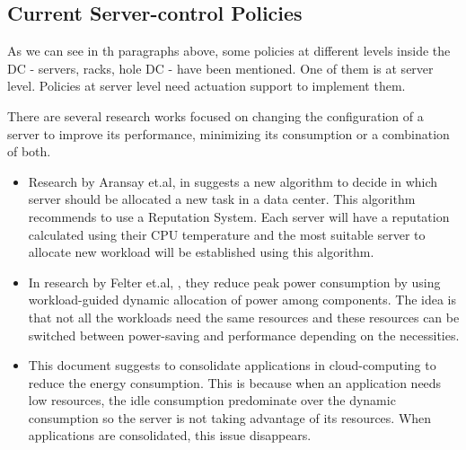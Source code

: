 \subsection{Current Server-control Policies}

As we can see in th paragraphs above, some policies at different levels inside the DC - servers, racks, hole DC - have been mentioned. One of them is at server level. Policies at server level need actuation support to implement them.

There are several research works focused on changing the configuration of a server to improve its performance, minimizing its consumption or a combination of both.

 
\begin{itemize}
    \item Research by Aransay et.al, in \cite{ignacioPaper} suggests a new algorithm to decide in which server should be allocated a new task in a data center. This algorithm recommends to use a Reputation System. Each server will have a reputation calculated using their CPU temperature and the most suitable server to allocate new workload will be established using this algorithm.

    \item In research by Felter et.al, \cite{Felter:2005:PAR:1088149.1088188}, they reduce peak power consumption by using workload-guided dynamic allocation of power among components. The idea is that not all the workloads need the same resources and these resources can be switched between power-saving and performance depending on the necessities.
    
    \item This document \cite{export:75408} suggests to consolidate applications in cloud-computing to reduce the energy consumption. This is because when an application needs low resources, the idle consumption predominate over the dynamic consumption so the server is not taking advantage of its resources. When applications are consolidated, this issue disappears.
    
    
\end{itemize}

    




